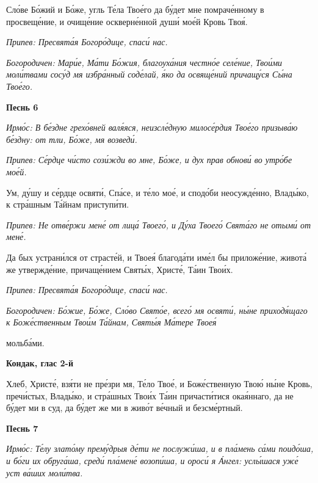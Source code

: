    Сло́ве Бо́жий и Бо́же, угль Те́ла Твое́го да бу́дет мне помраче́нному в
просвеще́ние, и очище́ние оскверне́нной души́ мое́й Кровь Твоя́.


 \itshape Припев:\normalfont{} Пресвята́я Богоро́дице, спаси́ нас.


 \itshape Богородичен:\normalfont{} Мари́е, Ма́ти Бо́жия, благоуха́ния честно́е селе́ние, Твои́ми
моли́твами сосу́д мя избра́нный соде́лай, я́ко да освяще́ний причащу́ся Сы́на
Твое́го.



 

\bfseries Песнь 6\normalfont{}


 \itshape Ирмо́с:\normalfont{} В бе́здне грехо́вней валя́яся, неизсле́дную милосе́рдия Твое́го призыва́ю
бе́здну: от тли, Бо́же, мя возведи́.


 \itshape Припев:\normalfont{} Се́рдце чи́сто сози́жди во мне, Бо́же, и дух прав обнови́ во утро́бе
мое́й.


   Ум, ду́шу и се́рдце освяти́, Спа́се, и те́ло мое́, и сподо́би неосужде́нно,
Влады́ко, к стра́шным Та́йнам приступи́ти.


 \itshape Припев:\normalfont{} Не отве́ржи мене́ от лица́ Твоего́, и Ду́ха Твоего́ Свята́го не отыми́ от
мене́.


   Да бых устрани́лся от страсте́й, и Твоея́ благода́ти име́л бы приложе́ние,
живота́ же утвержде́ние, причаще́нием Святы́х, Христе́, Та́ин Твои́х.


 \itshape Припев:\normalfont{} Пресвята́я Богоро́дице, спаси́ нас.


 \itshape Богородичен:\normalfont{} Бо́жие, Бо́же, Сло́во Свято́е, всего́ мя освяти́, ны́не
приходя́щаго к Боже́ственным Твои́м Та́йнам, Святы́я Ма́тере Твоея́

мольба́ми.



 

\bfseries Кондак, глас 2-й\normalfont{}


   Хлеб, Христе́, взя́ти не пре́зри мя, Те́ло Твое́, и Боже́ственную Твою́
ны́не Кровь, пречи́стых, Влады́ко, и стра́шных Твои́х Та́ин причасти́тися
окая́ннаго, да не бу́дет ми в суд, да бу́дет же ми в живо́т ве́чный и
безсме́ртный.



 

\bfseries Песнь 7\normalfont{}


 \itshape Ирмо́с:\normalfont{} Те́лу злато́му прему́дрыя де́ти не послужи́ша, и в пла́мень са́ми
поидо́ша, и бо́ги их обруга́ша, среди́ пла́мене́ возопи́ша, и ороси́ я А́нгел: услы́шася
уже́ уст ва́ших моли́тва.


